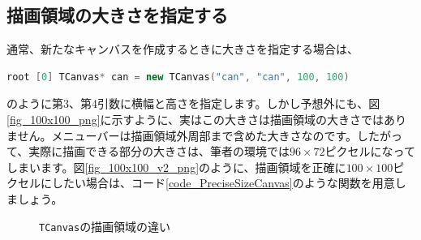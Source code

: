 \subsection{描画領域の大きさを指定する}
通常、新たなキャンバスを作成するときに大きさを指定する場合は、
\begin{lstlisting}[language=C++]
root [0] TCanvas* can = new TCanvas("can", "can", 100, 100)
\end{lstlisting}
のように第3、第4引数に横幅と高さを指定します。しかし予想外にも、図\ref{fig_100x100_png}に示すように、実はこの大きさは描画領域の大きさではありません。メニューバーは描画領域外周部まで含めた大きさなのです。したがって、実際に描画できる部分の大きさは、筆者の環境では$96\times72$ピクセルになってしまいます。図\ref{fig_100x100_v2_png}のように、描画領域を正確に$100\times100$ピクセルにしたい場合は、コード\ref{code_PreciseSizeCanvas}のような関数を用意しましょう。

\begin{figure}
  \centering
  \hfil
  \caption{\texttt{TCanvas}の描画領域の違い}
\end{figure}

\begin{NoFloat}

\end{NoFloat}

